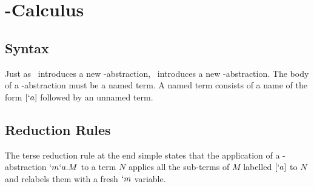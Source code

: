 \section{\lmu-Calculus}
  \subsection{Syntax}
  \begin{figure}[!h]
  \end{figure}
  
  Just as \lam\ introduces a new \lam-abstraction, \lmu\ introduces a new 
  \lmu-abstraction. The body of a \lmu-abstraction must be a named term. 
  A named term consists of a name of the form $[`a]$ followed by an unnamed 
  term. 

  \subsection{Reduction Rules}
  \begin{figure}[!h]
  \end{figure}

  The terse reduction rule at the end simple states that the application
  of a \lmu-abstraction $`m`a.M$ to a term $N$ applies all the sub-terms 
  of $M$ labelled $[`a]$ to $N$ and relabels them with a fresh $`m$ 
  variable.
  
